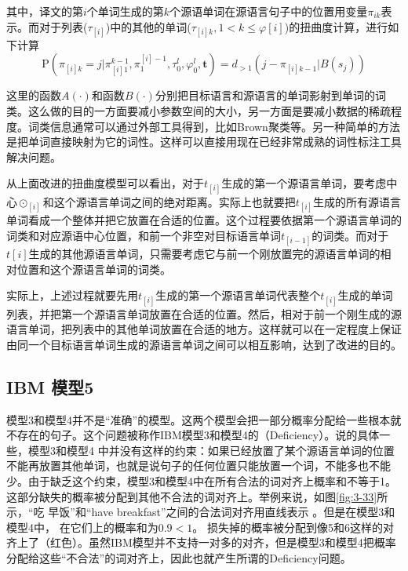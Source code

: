 \noindent 其中，译文的第$i$个单词生成的第$k$个源语单词在源语言句子中的位置用变量$\pi_{ik}$表示。而对于列表($\tau_{[i]}$)中的其他的单词($\tau_{[i]k},1 < k \le \varphi[i]$)的扭曲度计算，进行如下计算
\begin{equation}
\textrm{P}(\pi_{[i]k}=j|{\pi}_{[i]1}^{k-1},\pi_1^{[i]-1},\tau_0^l,\varphi_0^l,\mathbf{t})=d_{>1}(j-\pi_{[i]k-1}|B(s_j))
\label{eq:3-71}
\end{equation}

\parinterval 这里的函数$A(\cdot)$和函数$B(\cdot)$分别把目标语言和源语言的单词影射到单词的词类。这么做的目的一方面要减小参数空间的大小，另一方面是要减小数据的稀疏程度。词类信息通常可以通过外部工具得到，比如Brown聚类等。另一种简单的方法是把单词直接映射为它的词性。这样可以直接用现在已经非常成熟的词性标注工具解决问题。

\parinterval 从上面改进的扭曲度模型可以看出，对于$t_{[i]}$生成的第一个源语言单词，要考虑中心$\odot_{[i]}$和这个源语言单词之间的绝对距离。实际上也就要把$t_{[i]}$生成的所有源语言单词看成一个整体并把它放置在合适的位置。这个过程要依据第一个源语言单词的词类和对应源语中心位置，和前一个非空对目标语言单词$t_{[i-1]}$的词类。而对于$t[i]$生成的其他源语言单词，只需要考虑它与前一个刚放置完的源语言单词的相对位置和这个源语言单词的词类。

\parinterval 实际上，上述过程就要先用$t_{[i]}$生成的第一个源语言单词代表整个$t_{[i]}$生成的单词列表，并把第一个源语言单词放置在合适的位置。然后，相对于前一个刚生成的源语言单词，把列表中的其他单词放置在合适的地方。这样就可以在一定程度上保证由同一个目标语言单词生成的源语言单词之间可以相互影响，达到了改进的目的。


\subsection{ IBM 模型5}

\parinterval 模型3和模型4并不是``准确''的模型。这两个模型会把一部分概率分配给一些根本就不存在的句子。这个问题被称作IBM模型3和模型4的{\small{}}（Deficiency）。说的具体一些，模型3和模型4 中并没有这样的约束：如果已经放置了某个源语言单词的位置不能再放置其他单词，也就是说句子的任何位置只能放置一个词，不能多也不能少。由于缺乏这个约束，模型3和模型4中在所有合法的词对齐上概率和不等于1。 这部分缺失的概率被分配到其他不合法的词对齐上。举例来说，如图\ref{fig:3-33}所示，``吃 早饭''和``have breakfast''之间的合法词对齐用直线表示 。但是在模型3和模型4中， 在它们上的概率和为$0.9<1$。 损失掉的概率被分配到像5和6这样的对齐上了（红色）。虽然IBM模型并不支持一对多的对齐，但是模型3和模型4把概率分配给这些``不合法''的词对齐上，因此也就产生所谓的Deficiency问题。

